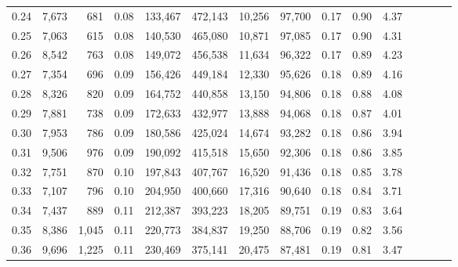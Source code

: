 \begin{tabular}{rrrcrrrrrrrrrrr}
0.24 &   7,673 &    681 &                                       0.08 &  133,467 &  472,143 &   10,256 &   97,700 &  0.17 &  0.90 &                         4.37 \\
0.25 &   7,063 &    615 &                                       0.08 &  140,530 &  465,080 &   10,871 &   97,085 &  0.17 &  0.90 &                         4.31 \\
0.26 &   8,542 &    763 &                                       0.08 &  149,072 &  456,538 &   11,634 &   96,322 &  0.17 &  0.89 &                         4.23 \\
0.27 &   7,354 &    696 &                                       0.09 &  156,426 &  449,184 &   12,330 &   95,626 &  0.18 &  0.89 &                         4.16 \\
0.28 &   8,326 &    820 &                                       0.09 &  164,752 &  440,858 &   13,150 &   94,806 &  0.18 &  0.88 &                         4.08 \\
0.29 &   7,881 &    738 &                                       0.09 &  172,633 &  432,977 &   13,888 &   94,068 &  0.18 &  0.87 &                         4.01 \\
0.30 &   7,953 &    786 &                                       0.09 &  180,586 &  425,024 &   14,674 &   93,282 &  0.18 &  0.86 &                         3.94 \\
0.31 &   9,506 &    976 &                                       0.09 &  190,092 &  415,518 &   15,650 &   92,306 &  0.18 &  0.86 &                         3.85 \\
0.32 &   7,751 &    870 &                                       0.10 &  197,843 &  407,767 &   16,520 &   91,436 &  0.18 &  0.85 &                         3.78 \\
0.33 &   7,107 &    796 &                                       0.10 &  204,950 &  400,660 &   17,316 &   90,640 &  0.18 &  0.84 &                         3.71 \\
0.34 &   7,437 &    889 &                                       0.11 &  212,387 &  393,223 &   18,205 &   89,751 &  0.19 &  0.83 &                         3.64 \\
0.35 &   8,386 &  1,045 &                                       0.11 &  220,773 &  384,837 &   19,250 &   88,706 &  0.19 &  0.82 &                         3.56 \\
0.36 &   9,696 &  1,225 &                                       0.11 &  230,469 &  375,141 &   20,475 &   87,481 &  0.19 &  0.81 &                         3.47 \\

\end{tabular}
